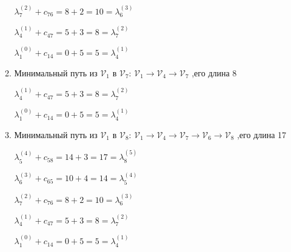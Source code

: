\begin{enumerate}
\begin{enumerate}
$\lambda^{(2)}_7 + c_{76} = 8 + 2 = 10 = \lambda^{(3)}_6$

$\lambda^{(1)}_4 + c_{47} = 5 + 3 = 8 = \lambda^{(2)}_7$

$\lambda^{(0)}_1 + c_{14} = 0 + 5 = 5 = \lambda^{(1)}_4$

\item Минимальный путь из $\mathcal{V}_1$ в $\mathcal{V}_7$: $\mathcal{V}_1\rightarrow\mathcal{V}_4\rightarrow\mathcal{V}_7$ ,его длина 8

$\lambda^{(1)}_4 + c_{47} = 5 + 3 = 8 = \lambda^{(2)}_7$

$\lambda^{(0)}_1 + c_{14} = 0 + 5 = 5 = \lambda^{(1)}_4$

\item Минимальный путь из $\mathcal{V}_1$ в $\mathcal{V}_8$: $\mathcal{V}_1\rightarrow\mathcal{V}_4\rightarrow\mathcal{V}_7\rightarrow\mathcal{V}_6\rightarrow\mathcal{V}_8$ ,его длина 17

$\lambda^{(4)}_5 + c_{58} = 14 + 3 = 17 = \lambda^{(5)}_8$

$\lambda^{(3)}_6 + c_{65} = 10 + 4 = 14 = \lambda^{(4)}_5$

$\lambda^{(2)}_7 + c_{76} = 8 + 2 = 10 = \lambda^{(3)}_6$

$\lambda^{(1)}_4 + c_{47} = 5 + 3 = 8 = \lambda^{(2)}_7$

$\lambda^{(0)}_1 + c_{14} = 0 + 5 = 5 = \lambda^{(1)}_4$
\end{enumerate}
\end{enumerate}

\newpage
